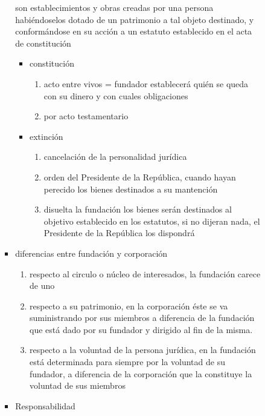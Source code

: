 \documentclass[]{article}
\providecommand{\tightlist}{%
  \setlength{\itemsep}{0pt}\setlength{\parskip}{0pt}}
\begin{document}
\begin{itemize}
\begin{itemize}
\begin{itemize}
\begin{itemize}
        son establecimientos y obras creadas por una persona
        habiéndoselos dotado de un patrimonio a tal objeto destinado, y
        conformándose en su acción a un estatuto establecido en el acta
        de constitución

        \begin{itemize}
        \tightlist
        \item
          constitución

          \begin{enumerate}
          \def\labelenumi{\arabic{enumi}.}
          \tightlist
          \item
            acto entre vivos = fundador establecerá quién se queda con
            su dinero y con cuales obligaciones
          \item
            por acto testamentario
          \end{enumerate}
        \item
          extinción

          \begin{enumerate}
          \def\labelenumi{\arabic{enumi}.}
          \tightlist
          \item
            cancelación de la personalidad jurídica
          \item
            orden del Presidente de la República, cuando hayan perecido
            los bienes destinados a su mantención
          \item
            disuelta la fundación los bienes serán destinados al
            objetivo establecido en los estatutos, si no dijeran nada,
            el Presidente de la República los dispondrá
          \end{enumerate}
        \end{itemize}
      \item
        diferencias entre fundación y corporación

        \begin{enumerate}
        \def\labelenumi{\arabic{enumi}.}
        \tightlist
        \item
          respecto al circulo o núcleo de interesados, la fundación
          carece de uno
        \item
          respecto a su patrimonio, en la corporación éste se va
          suministrando por sus miembros a diferencia de la fundación
          que está dado por su fundador y dirigido al fin de la misma.
        \item
          respecto a la voluntad de la persona jurídica, en la fundación
          está determinada para siempre por la voluntad de su fundador,
          a diferencia de la corporación que la constituye la voluntad
          de sus miembros
        \end{enumerate}
      \item
        Responsabilidad


\end{itemize}
\end{itemize}
\end{itemize}
\end{itemize}
\end{document}
